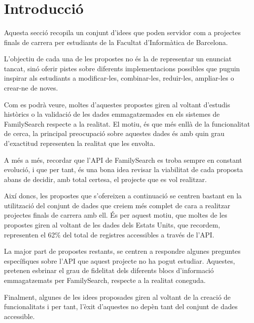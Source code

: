 \section{Introducció}

    \paragraph{}
    Aquesta secció recopila un conjunt d'idees que poden servidor com a projectes finals de carrera per estudiants de la Facultat d'Informàtica de Barcelona.

    L'objectiu de cada una de les propostes no és la de representar un enunciat tancat, sinó oferir pistes sobre diferents implementacions possibles que puguin inspirar als estudiants a modificar-les, combinar-les, reduir-les, ampliar-les o crear-ne de noves.

    Com es podrà veure, moltes d'aquestes propostes giren al voltant d'estudis històrics o la validació de les dades emmagatzemades en els sistemes de FamilySearch respecte a la realitat. El motiu, és que més enllà de la funcionalitat de cerca, la principal preocupació sobre aquestes dades és amb quin grau d'exactitud representen la realitat que les envolta.

    A més a més, recordar que l'API de FamilySearch es troba sempre en constant evolució, i que per tant, és una bona idea revisar la viabilitat de cada proposta abans de decidir, amb total certesa, el projecte que es vol realitzar.

    Així doncs, les propostes que s’ofereixen a continuació se centren bastant en la utilització del conjunt de dades que creiem més complet de cara a realitzar projectes finals de carrera amb ell. És per aquest motiu, que moltes de les propostes giren al voltant de les dades dels Estats Units, que recordem, representen el 62\% del total de registres accessibles a través de l’API.

    La major part de propostes restants, se centren a respondre algunes preguntes específiques sobre l’API que aquest projecte no ha pogut estudiar. Aquestes, pretenen esbrinar el grau de fidelitat dels diferents blocs d’informació emmagatzemats per FamilySearch, respecte a la realitat coneguda.

    Finalment, algunes de les idees proposades giren al voltant de la creació de funcionalitats i per tant, l’èxit d’aquestes no depèn tant del conjunt de dades accessible.
